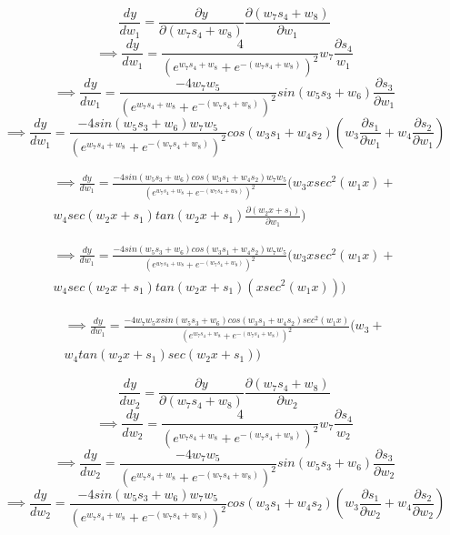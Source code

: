 \documentclass[solution,addpoints,12pt]{exam}
\begin{document}
\begin{questions}
          \begin{solution}
          \[\frac{dy}{dw_{1}} = \frac{\partial y}{\partial (w_{7}s_{4}+w_{8})} \frac{\partial (w_{7}s_{4}+w_{8})}{\partial w_{1}}\]
          \[\implies \frac{dy}{dw_{1}} = \frac{4}{(e^{w_{7}s_{4}+w_{8}}+e^{-(w_{7}s_{4}+w_{8})})^2} w_{7} \frac{\partial s_{4}}{w_{1}}\]
          \[\implies \frac{dy}{dw_{1}} = \frac{-4w_{7}w_{5}}{(e^{w_{7}s_{4}+w_{8}}+e^{-(w_{7}s_{4}+w_{8})})^2} sin(w_{5}s_{3}+w_{6}) \frac{\partial s_{3}}{\partial w_{1}}\]
          \[\implies \frac{dy}{dw_{1}} = \frac{-4sin(w_{5}s_{3}+w_{6})w_{7}w_{5}}{(e^{w_{7}s_{4}+w_{8}}+e^{-(w_{7}s_{4}+w_{8})})^2} cos(w_{3}s_{1}+w_{4}s_{2})(w_{3}\frac{\partial s_{1}}{\partial w_{1}}+w_{4}\frac{\partial s_{2}}{\partial w_{1}})\]
          
          \begin{multline*}
          \implies \frac{dy}{dw_{1}} = \frac{-4sin(w_{5}s_{3}+w_{6})cos(w_{3}s_{1}+w_{4}s_{2})w_{7}w_{5}}{(e^{w_{7}s_{4}+w_{8}}+e^{-(w_{7}s_{4}+w_{8})})^2} (w_{3}xsec^2(w_{1}x) + \\ w_{4}sec(w_{2}x+s_{1})tan(w_{2}x+s_{1})\frac{\partial (w_{2}x+s_{1})}{\partial w_{1}}) \end{multline*}
          
          \begin{multline*}
          \implies \frac{dy}{dw_{1}} = \frac{-4sin(w_{5}s_{3}+w_{6})cos(w_{3}s_{1}+w_{4}s_{2})w_{7}w_{5}}{(e^{w_{7}s_{4}+w_{8}}+e^{-(w_{7}s_{4}+w_{8})})^2} (w_{3}xsec^2(w_{1}x) + \\ w_{4}sec(w_{2}x+s_{1})tan(w_{2}x+s_{1})(xsec^2(w_{1}x))) \end{multline*}
          
          \begin{multline*}
          \implies \frac{dy}{dw_{1}} = \frac{-4w_{7}w_{5}xsin(w_{5}s_{3}+w_{6})cos(w_{3}s_{1}+w_{4}s_{2})sec^2(w_{1}x)}{(e^{w_{7}s_{4}+w_{8}}+e^{-(w_{7}s_{4}+w_{8})})^2} (w_{3} + \\ w_{4}tan(w_{2}x+s_{1})sec(w_{2}x+s_{1}))
          \end{multline*}
          
          \[\frac{dy}{dw_{2}} = \frac{\partial y}{\partial (w_{7}s_{4}+w_{8})} \frac{\partial (w_{7}s_{4}+w_{8})}{\partial w_{2}}\]
          \[\implies \frac{dy}{dw_{2}} = \frac{4}{(e^{w_{7}s_{4}+w_{8}}+e^{-(w_{7}s_{4}+w_{8})})^2} w_{7} \frac{\partial s_{4}}{w_{2}}\]
          \[\implies \frac{dy}{dw_{2}} = \frac{-4w_{7}w_{5}}{(e^{w_{7}s_{4}+w_{8}}+e^{-(w_{7}s_{4}+w_{8})})^2} sin(w_{5}s_{3}+w_{6}) \frac{\partial s_{3}}{\partial w_{2}}\]
          \[\implies \frac{dy}{dw_{2}} = \frac{-4sin(w_{5}s_{3}+w_{6})w_{7}w_{5}}{(e^{w_{7}s_{4}+w_{8}}+e^{-(w_{7}s_{4}+w_{8})})^2} cos(w_{3}s_{1}+w_{4}s_{2})(w_{3}\frac{\partial s_{1}}{\partial w_{2}}+w_{4}\frac{\partial s_{2}}{\partial w_{2}})\]
          

\end{solution}
\end{questions}
\end{document}
